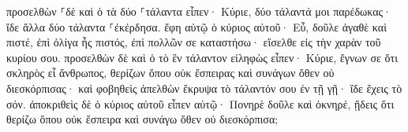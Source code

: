 \documentclass{openreader}
\begin{document}
προσελθὼν ⸀δὲ καὶ ὁ τὰ δύο ⸀τάλαντα εἶπεν· Κύριε, δύο τάλαντά μοι παρέδωκας· ἴδε ἄλλα δύο τάλαντα ⸀ἐκέρδησα. 
ἔφη αὐτῷ ὁ κύριος αὐτοῦ· Εὖ, δοῦλε ἀγαθὲ καὶ πιστέ, ἐπὶ ὀλίγα ἦς πιστός, ἐπὶ πολλῶν σε καταστήσω· εἴσελθε εἰς τὴν χαρὰν τοῦ κυρίου σου. 
προσελθὼν δὲ καὶ ὁ τὸ ἓν τάλαντον εἰληφὼς εἶπεν· Κύριε, ἔγνων σε ὅτι σκληρὸς εἶ ἄνθρωπος, θερίζων ὅπου οὐκ ἔσπειρας καὶ συνάγων ὅθεν οὐ διεσκόρπισας· 
καὶ φοβηθεὶς ἀπελθὼν ἔκρυψα τὸ τάλαντόν σου ἐν τῇ γῇ· ἴδε ἔχεις τὸ σόν. 
ἀποκριθεὶς δὲ ὁ κύριος αὐτοῦ εἶπεν αὐτῷ· Πονηρὲ δοῦλε καὶ ὀκνηρέ, ᾔδεις ὅτι θερίζω ὅπου οὐκ ἔσπειρα καὶ συνάγω ὅθεν οὐ διεσκόρπισα; 
\end{document}
